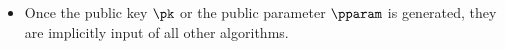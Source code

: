 \begin{itemize}
    \item Once the public key $\pk$ or the public parameter $\pparam$ is generated, they are implicitly input of all other algorithms.
\end{itemize}